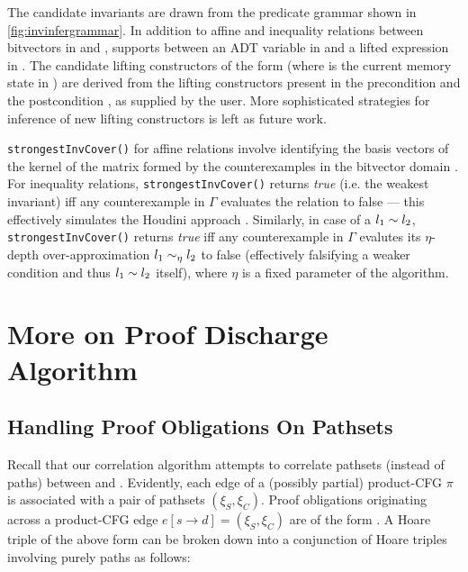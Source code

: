 The candidate invariants are drawn from the predicate grammar \invgrammar{} shown in \cref{fig:invinfergrammar}.
In addition to affine and inequality relations between bitvectors in \sprog{} and \cprog{},
\invgrammar{} supports \recursiveRelations{} between an ADT variable in \sprog{} and a lifted expression in \cprog{}.
The candidate lifting constructors of the form  (where \mem{} is the current
memory state in \cprog{}) are derived from the lifting constructors
present in the precondition \pre{} and the postcondition \post{}, as supplied by the user.
More sophisticated strategies for inference of new lifting constructors is left as future work.

{\tt strongestInvCover()} for affine relations involve identifying the basis vectors of the kernel of the
matrix formed by the counterexamples in the bitvector domain \cite{esop05,semalign}.
For inequality relations, {\tt strongestInvCover(\Gamma)}
returns {\em true} (i.e. the weakest invariant) iff any counterexample in $\Gamma$ evaluates the
relation to false --- this effectively simulates the Houdini approach \cite{houdini}.
Similarly, in case of a \recursiveRelation{} $l_1 \sim{} l_2$, {\tt strongestInvCover(\Gamma)}
returns {\em true} iff any counterexample in $\Gamma$ evalutes its $\eta$-depth over-approximation
$l_1 \sim_{\eta} l_2$ to false (effectively falsifying a weaker condition and thus $l_1 \sim{} l_2$ itself), where $\eta$ is a fixed parameter of the algorithm.

\section{More on Proof Discharge Algorithm}
\label{sec:proofalgo}

\subsection{Handling Proof Obligations On Pathsets}
\label{sec:pathsethoaretriples}
Recall that our correlation algorithm attempts to correlate pathsets (instead of paths) between \sprog{} and \cprog{}.
Evidently, each edge of a (possibly partial) product-CFG $\pi$ is associated with a pair of pathsets $(\xi_S,\xi_C)$.
Proof obligations originating across a product-CFG edge $e[s \rightarrow d]=(\xi_S,\xi_C)$ are of
the form .
A Hoare triple of the above form can be broken down into a conjunction of Hoare triples involving purely paths as follows:

